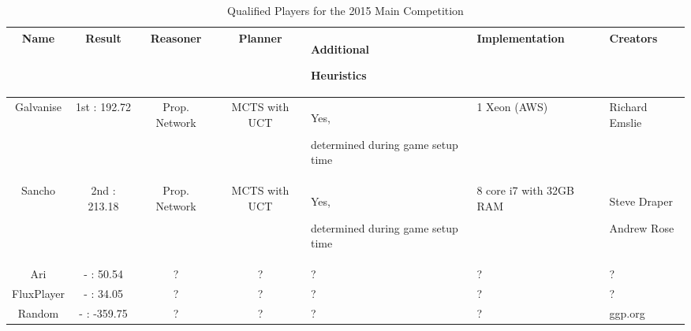\begin{table}[h]
\caption{Qualified Players for the 2015 Main Competition}
\label{2015 World Competition}
\small
\begin{tabular}{| c | c | c | c | p{2.5cm} | p{2.5cm} | p{2.5cm} |}
\hline  Name & Result & Reasoner & Planner & Additional \par Heuristics & Implementation & Creators \\

\hline  Galvanise & 1st : 192.72 & Prop. Network & MCTS with UCT & Yes, \par determined during game setup time & 1 Xeon (AWS) & Richard Emslie \\

\hline  Sancho & 2nd : 213.18 & Prop. Network & MCTS with UCT & Yes, \par determined during game setup time & 8 core i7 with 32GB RAM & Steve Draper \par Andrew Rose \\


\hline  Ari & - : 50.54 & ? & ? & ? & ? & ? \\

\hline  FluxPlayer & - : 34.05 & ? & ? & ? & ? & ? \\

\hline  Random & - : -359.75 & ? & ? & ? & ? & ggp.org \\



\hline
\end{tabular}
\end{table}


